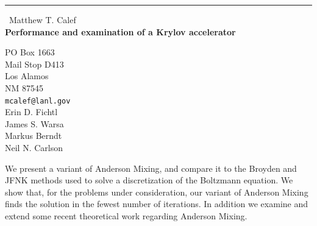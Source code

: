 \documentclass{report}
\begin{document}
\begin{center}
\rule{6in}{1pt} \
{\large Matthew T. Calef \\
{\bf Performance and examination of a Krylov accelerator}}

PO Box 1663 \\ Mail Stop D413 \\ Los Alamos \\ NM 87545
\\
{\tt mcalef@lanl.gov}\\
Erin D. Fichtl\\
James S. Warsa\\
Markus Berndt\\
Neil N. Carlson\end{center}

We present a variant of Anderson Mixing, and compare it to the Broyden
and JFNK methods used to solve a discretization of the Boltzmann
equation. We show that, for the problems under consideration, our variant
of Anderson Mixing finds the solution in the fewest number of iterations.
In addition we examine and extend some recent theoretical work regarding
Anderson Mixing.
\end{document}
